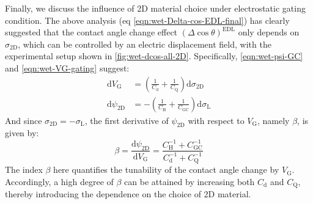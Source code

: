 Finally, we discuss the influence of 2D material choice under
electrostatic gating condition. The above analysis (eq
\autoref{eqn:wet-Delta-cos-EDL-final}) has clearly suggested that the contact
angle change effect \((\Delta \cos \theta)^{\mathrm{EDL}}\) only depends
on \(\sigma_{\mathrm{2D}}\), which can be controlled by an electric
displacement field, with the experimental setup shown in 
\autoref{fig:wet-dcos-all-2D}. Specifically,  \autoref{eqn:wet-psi-GC} and
\autoref{eqn:wet-VG-gating} suggest:
\begin{equation}
\label{eqn:wet-dVG-choice-2D}
\begin{aligned}
\mathrm{d} V_{\mathrm{G}} &= (\frac{1}{C_{\mathrm{d}}} + \frac{1}{C_{\mathrm{Q}}}) \mathrm{d} \sigma_{\mathrm{2D}} \\
\mathrm{d} \psi_{\mathrm{2D}} &= -(\frac{1}{C_{\mathrm{H}}} + \frac{1}{C_{\mathrm{GC}}}) \mathrm{d} \sigma_{\mathrm{L}}
\end{aligned}
\end{equation}
And since \(\sigma_{\mathrm{2D}} = -\sigma_{\mathrm{L}}\), the first
derivative of \(\psi_{\mathrm{2D}}\) with respect to \(V_{\mathrm{G}}\), namely \(\beta\), is given by:
\begin{equation}
\label{eqn:wet-def-beta}
\beta = \dfrac{\mathrm{d} \psi_{\mathrm{2D}}}{\mathrm{d} V_{\mathrm{G}}} 
= \dfrac{C_{\mathrm{H}}^{-1} + C_{\mathrm{GC}}^{-1}}{C_{\mathrm{d}}^{-1} + C_{\mathrm{Q}}^{-1}}
\end{equation}
The index \(\beta\) here quantifies the tunability of the contact angle change
by \(V_{\mathrm{G}}\). Accordingly, a high degree of \(\beta\) can be attained by increasing both \(C_{\mathrm{d}}\) and
\(C_{\mathrm{Q}}\), thereby introducing the dependence on the choice of 2D material.

